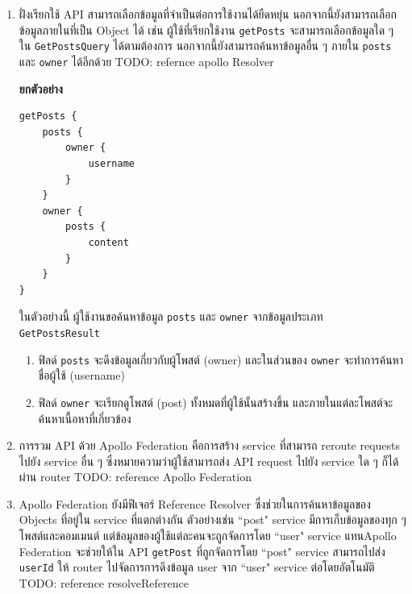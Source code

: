 \begin{enumerate}
\begin{enumerate}
\begin{enumerate}
            \item ฝั่งเรียกใช้ API สามารถเลือกข้อมูลที่จำเป็นต่อการใช้งานได้ยืดหยุ่น นอกจากนี้ยังสามารถเลือกข้อมูลภายในที่เป็น Object ได้ เช่น ผู้ใช้ที่เรียกใช้งาน \texttt{getPosts} จะสามารถเลือกข้อมูลใด ๆ ใน \texttt{GetPostsQuery} ได้ตามต้องการ นอกจากนี้ยังสามารถค้นหาข้อมูลอื่น ๆ ภายใน \texttt{posts} และ \texttt{owner} ได้อีกด้วย TODO: refernce apollo Resolver
            
            \textbf{ยกตัวอย่าง}
            \begin{center}                
                \begin{lstlisting}
getPosts {
    posts {
        owner {
            username
        }
    }
    owner {
        posts {
            content
        }
    }
}
                \end{lstlisting}
            \end{center}
            ในตัวอย่างนี้ ผู้ใช้งานขอค้นหาข้อมูล \texttt{posts} และ \texttt{owner} จากข้อมูลประเภท \texttt{GetPostsResult}
            \begin{enumerate}
                \item ฟิลด์ \texttt{posts} จะดึงข้อมูลเกี่ยวกับผู้โพสต์ (owner) และในส่วนของ \texttt{owner} จะทำการค้นหาชื่อผู้ใช้ (username)
                \item ฟิลด์ \texttt{owner} จะเรียกดูโพสต์ (post) ทั้งหมดที่ผู้ใช้นั้นสร้างขึ้น และภายในแต่ละโพสต์จะค้นหาเนื้อหาที่เกี่ยวข้อง
            \end{enumerate}
           
           \item การรวม API ด้วย Apollo Federation คือการสร้าง service ที่สามารถ reroute requests ไปยัง service อื่น ๆ ซึ่งหมายความว่าผู้ใช้สามารถส่ง API request ไปยัง service ใด ๆ ก็ได้ผ่าน router TODO: reference Apollo Federation

           \item Apollo Federation ยังมีฟีเจอร์ Reference Resolver ซึ่งช่วยในการค้นหาข้อมูลของ Objects ที่อยู่ใน service ที่แตกต่างกัน ตัวอย่างเช่น ``post" service มีการเก็บข้อมูลของทุก ๆ โพสต์และคอมเมนต์ แต่ข้อมูลของผู้ใช้แต่ละคนจะถูกจัดการโดย ``user" service แทน\enskip Apollo Federation จะช่วยให้ใน API \texttt{getPost} ที่ถูกจัดการโดย ``post" service สามารถไปส่ง \texttt{userId} ให้ router ไปจัดการการดึงข้อมูล user จาก ``user" service ต่อโดยอัตโนมัติ TODO: reference resolveReference


\end{enumerate}
\end{enumerate}
\end{enumerate}
